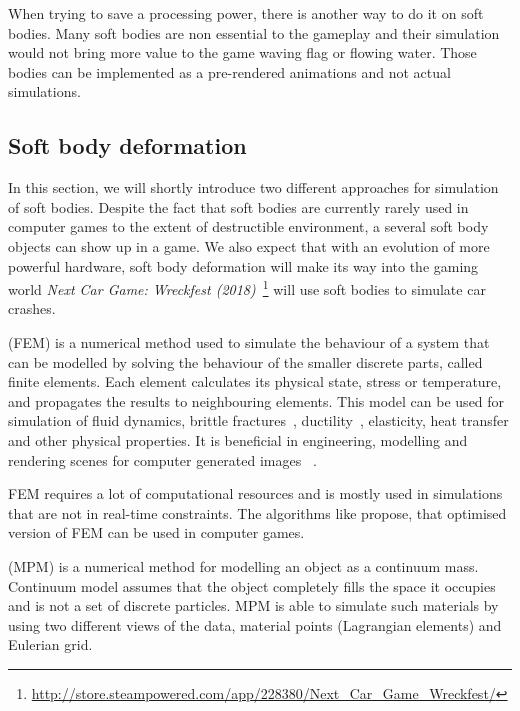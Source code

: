 When trying to save a processing power, there is another way to do it on soft bodies. Many soft bodies are non essential to the gameplay and their simulation would not bring more value to the game \eg waving flag or flowing water. Those bodies can be implemented as a pre-rendered animations and not actual simulations.

\subsection{Soft body deformation}
In this section, we will shortly introduce two different approaches for simulation of soft bodies. Despite the fact that soft bodies are currently rarely used in computer games to the extent of destructible environment, a several soft body objects can show up in a game. We also expect that with an evolution of more powerful hardware, soft body deformation will make its way into the gaming world \eg \emph{Next Car Game: Wreckfest (2018)}~\footnote{\url{http://store.steampowered.com/app/228380/Next\_Car\_Game\_Wreckfest/}} will use soft bodies to simulate car crashes.
\label{sec:softBody}

 (FEM) is a numerical method used to simulate the behaviour of a system that can be modelled by solving the behaviour of the smaller discrete parts, called finite elements. Each element calculates its physical state, \eg stress or temperature, and propagates the results to neighbouring elements. This model can be used for simulation of fluid dynamics, brittle fractures~\cite{brittlefracture}, ductility~\cite{ductilefracture}, elasticity, heat transfer and other physical properties. It is beneficial in engineering, modelling and rendering scenes for computer generated images ~\cite{Bargteil:2007:AFE}. 

FEM requires a lot of computational resources and is mostly used in simulations that are not in real-time constraints. The algorithms like \citet{femingames} propose, that optimised version of FEM can be used in computer games.


 (MPM) is a numerical method for modelling an object as a continuum mass. Continuum model assumes that the object completely fills the space it occupies and is not a set of discrete particles. MPM is able to simulate such materials by using two different views of the data, material points (Lagrangian elements) and Eulerian grid.



